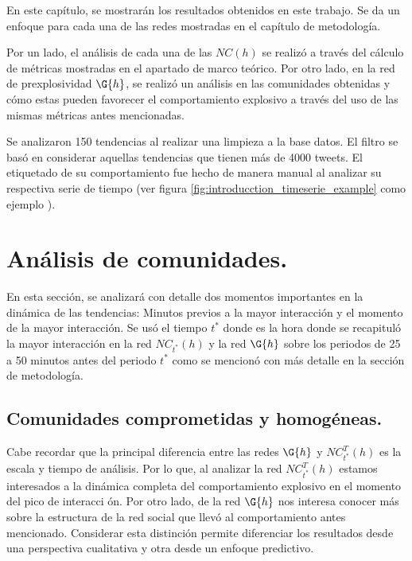 \documentclass[../main.tex]{subfiles}
\begin{document}
\onehalfspacing

En este capítulo, se mostrarán los resultados obtenidos en este trabajo. Se da un enfoque para cada una de las redes mostradas en el capítulo de metodología.%

Por un lado, el análisis de cada una de las $NC(h)$ se realizó a través del cálculo de métricas mostradas en el apartado de marco teórico.  Por otro lado, en la red de prexplosividad $\G{h}$, se realizó un análisis en las comunidades obtenidas y cómo estas pueden favorecer el comportamiento explosivo a través del uso de las mismas métricas antes mencionadas.

Se analizaron 150 tendencias al realizar una limpieza a la base datos. El filtro se basó en considerar aquellas tendencias que tienen más de 4000 tweets. El etiquetado de su comportamiento fue hecho de manera manual al analizar su respectiva serie de tiempo (ver figura \ref{fig:introducction_timeserie_example} como ejemplo ).


\section{Análisis de comunidades.}

En esta sección, se analizará con detalle dos momentos importantes en la dinámica de las tendencias: Minutos previos a la mayor interacción y el momento de la mayor interacción.  Se usó el tiempo $t^{*}$ donde es la hora donde se recapituló la mayor interacción en la red $NC_{t^{*}}(h)$ y la red $\G{h}$ sobre los periodos de 25 a 50 minutos antes del periodo $t^{*}$ como se mencionó con más detalle en la sección de metodología.


\subsection{Comunidades comprometidas y homogéneas.}

Cabe recordar que la principal diferencia entre las redes $\G{h}$ y $NC^{T}_{t^{*}}(h)$ es la escala y tiempo de análisis. Por lo que, al analizar la red $NC^{T}_{t^{*}}(h)$ estamos interesados a la dinámica completa del comportamiento explosivo en el momento del pico de interacci
ón. Por otro lado, de la red $\G{h}$ nos interesa conocer más sobre la estructura de la red social que llevó al comportamiento antes mencionado. Considerar esta distinción permite diferenciar los resultados desde una perspectiva cualitativa y otra desde un enfoque predictivo.
\end{document}

